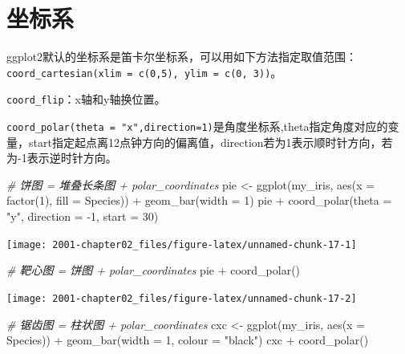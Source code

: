\documentclass[
]{book}
\newenvironment{Shaded}{\begin{snugshade}}{\end{snugshade}}
\newcommand{\AttributeTok}[1]{\textcolor[rgb]{0.77,0.63,0.00}{#1}}
\newcommand{\CommentTok}[1]{\textcolor[rgb]{0.56,0.35,0.01}{\textit{#1}}}
\newcommand{\DecValTok}[1]{\textcolor[rgb]{0.00,0.00,0.81}{#1}}
\newcommand{\FunctionTok}[1]{\textcolor[rgb]{0.00,0.00,0.00}{#1}}
\newcommand{\NormalTok}[1]{#1}
\newcommand{\OtherTok}[1]{\textcolor[rgb]{0.56,0.35,0.01}{#1}}
\newcommand{\SpecialCharTok}[1]{\textcolor[rgb]{0.00,0.00,0.00}{#1}}
\newcommand{\StringTok}[1]{\textcolor[rgb]{0.31,0.60,0.02}{#1}}
\begin{document}
\hypertarget{ux5750ux6807ux7cfb}{%
\section{坐标系}\label{ux5750ux6807ux7cfb}}

ggplot2默认的坐标系是笛卡尔坐标系，可以用如下方法指定取值范围：\texttt{coord\_cartesian(xlim\ =\ c(0,5),\ ylim\ =\ c(0,\ 3))}。

\texttt{coord\_flip}：x轴和y轴换位置。

\texttt{coord\_polar(theta\ =\ "x",direction=1)}是角度坐标系,theta指定角度对应的变量，start指定起点离12点钟方向的偏离值，direction若为1表示顺时针方向，若为-1表示逆时针方向。

\begin{Shaded}
\begin{Highlighting}[]
\CommentTok{\# 饼图 = 堆叠长条图 + polar\_coordinates}
\NormalTok{pie }\OtherTok{\textless{}{-}} \FunctionTok{ggplot}\NormalTok{(my\_iris, }\FunctionTok{aes}\NormalTok{(}\AttributeTok{x =} \FunctionTok{factor}\NormalTok{(}\DecValTok{1}\NormalTok{), }\AttributeTok{fill =}\NormalTok{ Species)) }\SpecialCharTok{+} \FunctionTok{geom\_bar}\NormalTok{(}\AttributeTok{width =} \DecValTok{1}\NormalTok{)}
\NormalTok{pie }\SpecialCharTok{+} \FunctionTok{coord\_polar}\NormalTok{(}\AttributeTok{theta =} \StringTok{"y"}\NormalTok{, }\AttributeTok{direction =} \SpecialCharTok{{-}}\DecValTok{1}\NormalTok{, }\AttributeTok{start =} \DecValTok{30}\NormalTok{)}
\end{Highlighting}
\end{Shaded}

\begin{center}\texttt{[image: 2001-chapter02\_files/figure-latex/unnamed-chunk-17-1]} \end{center}

\begin{Shaded}
\begin{Highlighting}[]
\CommentTok{\# 靶心图 = 饼图 + polar\_coordinates}
\NormalTok{pie }\SpecialCharTok{+} \FunctionTok{coord\_polar}\NormalTok{()}
\end{Highlighting}
\end{Shaded}

\begin{center}\texttt{[image: 2001-chapter02\_files/figure-latex/unnamed-chunk-17-2]} \end{center}

\begin{Shaded}
\begin{Highlighting}[]
\CommentTok{\# 锯齿图 = 柱状图 + polar\_coordinates}
\NormalTok{cxc }\OtherTok{\textless{}{-}} \FunctionTok{ggplot}\NormalTok{(my\_iris, }\FunctionTok{aes}\NormalTok{(}\AttributeTok{x =}\NormalTok{ Species)) }\SpecialCharTok{+} \FunctionTok{geom\_bar}\NormalTok{(}\AttributeTok{width =} \DecValTok{1}\NormalTok{, }\AttributeTok{colour =} \StringTok{"black"}\NormalTok{)}
\NormalTok{cxc }\SpecialCharTok{+} \FunctionTok{coord\_polar}\NormalTok{()}
\end{Highlighting}
\end{Shaded}
\end{document}
